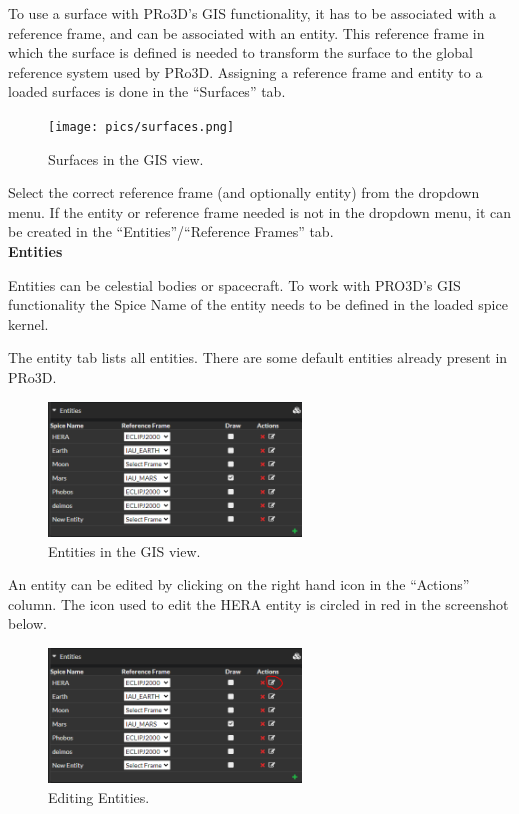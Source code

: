 To use a surface with PRo3D's GIS functionality, it has to be associated
with a reference frame, and can be associated with an entity. This
reference frame in which the surface is defined is needed to transform
the surface to the global reference system used by PRo3D. Assigning a
reference frame and entity to a loaded surfaces is done in the
``Surfaces'' tab.

\begin{figure}[h!]
	\centering
\texttt{[image: pics/surfaces.png]}
	\caption{Surfaces in the GIS view.}
\end{figure}


Select the correct reference frame (and optionally entity) from the
dropdown menu. If the entity or reference frame needed is not in the
dropdown menu, it can be created in the ``Entities''/``Reference
Frames'' tab.
\\

\hypertarget{entities}{%
	\textbf{Entities}\label{entities}}

Entities can be celestial bodies or spacecraft. To work with PRO3D's GIS
functionality the Spice Name of the entity needs to be defined in the
loaded spice kernel.

The entity tab lists all entities. There are some default entities
already present in PRo3D.

\begin{figure}[h!]
	\centering
	\includegraphics[width=0.6\textwidth]{pics/entities.png}
	\caption{Entities in the GIS view.}
\end{figure}



An entity can be edited by clicking on the right hand icon in the
``Actions'' column. The icon used to edit the HERA entity is circled in
red in the screenshot below.

\begin{figure}[h!]
	\centering
	\includegraphics[width=0.6\textwidth]{pics/editEntities.png}
	\caption{Editing Entities.}
\end{figure}

